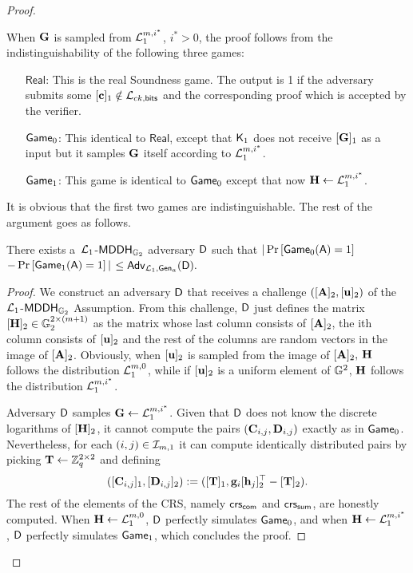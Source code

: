 \begin{proof}
\begin{description}
When $\mathbf{{G}}$ is sampled from $\mathcal{L}_1^{m,i^*}$, ${i^*}>0$, the proof follows from the indistinguishability of the following three games:
\begin{itemize}
\item[$\mathsf{Real}$:] This is the real Soundness game. The output is 1 if the adversary submits some $[\mathbf{c}]_1\notin\mathcal{L}_{ck,\mathsf{bits}}$ and the corresponding proof which is accepted by the verifier.
\item[$\mathsf{Game}_0$:] This identical to $\mathsf{Real}$, except that $\mathsf{K}_1$ does not receive $[\mathbf{{G}}]_1$ as a input but
it samples $\mathbf{{G}}$ itself according to $\mathcal{L}_1^{m,i^*}$.
\item[$\mathsf{Game}_1$:] This game is identical to $\mathsf{Game}_0$ except that now $\mathbf{{H}}\gets\mathcal{L}_1^{m,i^*}$.
\end{itemize}

It is obvious that the first two games are indistinguishable. The rest of the argument goes as follows.

\begin{lemma} There exists a\ $\mathcal{L}_1$-$\mathsf{MDDH}_{\mathbb{G}_2}$ adversary $\mathsf{D}$ such that
$|\Pr\left[\mathsf{Game}_{0}(\mathsf{A})=1\right]$ $-\Pr\left[\mathsf{Game}_{1}(\mathsf{A})=1\right]|$ $\leq \mathsf{Adv}_{\mathcal{L}_1,\mathsf{Gen}_a}(\mathsf{D}).$
\end{lemma}
\begin{proof}
We construct an adversary $\mathsf{D}$ that receives 
a challenge $([\mathbf{{A}}]_2,[\mathbf{u}]_2)$ of the 
$\mathcal{L}_1$-$\mathsf{MDDH}_{\mathbb{G}_2}$ Assumption. From this challenge, $\mathsf{D}$ just defines the matrix  $[\mathbf{{H}}]_2\in\mathbb{G}_2^{2\times(m+1)}$ as the matrix whose last column consists of $[\mathbf{{A}}]_2$, the ith column consists of $[\mathbf{u}]_2$ and the rest of the columns are random vectors in the image of $[\mathbf{{A}}]_2$. 
Obviously, when $[\mathbf{u}]_2$ is sampled from 
the image of $[\mathbf{{A}}]_2,$ $\mathbf{{H}}$ follows the distribution $\mathcal{L}_1^{m,0}$, while if $[\mathbf{u}]_2$ is a uniform element of $\mathbb{G}^2$, $\mathbf{{H}}$ follows the distribution $\mathcal{L}_1^{m,i^*}$. 
 
Adversary $\mathsf{D}$ samples
$\mathbf{{G}} \gets \mathcal{L}_1^{m,i^*}$. Given that $\mathsf{D}$ does not know the discrete logarithms of $[\mathbf{{H}}]_2$, it cannot compute the pairs $(\mathbf{{C}}_{i,j},\mathbf{{D}}_{i,j})$ exactly as in $\mathsf{Game}_0$. Nevertheless, for each $(i,j)\in\mathcal{I}_{m,1}$ it can compute identically distributed pairs by picking $\mathbf{{T}}\gets\mathbb{Z}_q^{2\times 2}$ and defining
$$
([\mathbf{{C}}_{i,j}]_1,[\mathbf{{D}}_{i,j}]_2):=([\mathbf{{T}}]_1,\mathbf{g}_i[\mathbf{h}_j]_2^\top-[\mathbf{{T}}]_2).
$$
The rest of the elements of the CRS, namely $\mathsf{crs}_{\mathsf{com}}$ and $\mathsf{crs}_{\mathsf{sum}}$, are honestly computed. When $\mathbf{{H}}\gets\mathcal{L}_1^{m,0}$, $\mathsf{D}$ perfectly simulates $\mathsf{Game}_0$, and when $\mathbf{{H}}\gets\mathcal{L}_1^{m,i^*}$, $\mathsf{D}$ perfectly simulates $\mathsf{Game}_1$, which concludes the proof. 
\end{proof}


\end{description}
\end{proof}
